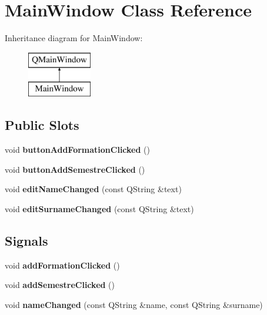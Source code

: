 \hypertarget{classMainWindow}{\section{Main\+Window Class Reference}
\label{classMainWindow}
}
Inheritance diagram for Main\+Window\+:\begin{figure}[H]
\begin{center}
\leavevmode
\includegraphics[height=2.000000cm]{classMainWindow}
\end{center}
\end{figure}
\subsection*{Public Slots}
\begin{DoxyCompactItemize}
\item 
\hypertarget{classMainWindow_ae57c5976e1e8afb836fc0668aaaa000c}{void {\bfseries button\+Add\+Formation\+Clicked} ()}\label{classMainWindow_ae57c5976e1e8afb836fc0668aaaa000c}

\item 
\hypertarget{classMainWindow_ac92e784d08c3797023da714057db1cfc}{void {\bfseries button\+Add\+Semestre\+Clicked} ()}\label{classMainWindow_ac92e784d08c3797023da714057db1cfc}

\item 
\hypertarget{classMainWindow_a5966da1b123ebab9fa12804a650148db}{void {\bfseries edit\+Name\+Changed} (const Q\+String \&text)}\label{classMainWindow_a5966da1b123ebab9fa12804a650148db}

\item 
\hypertarget{classMainWindow_a0d4a0102449a45525b9877b93ff5abb4}{void {\bfseries edit\+Surname\+Changed} (const Q\+String \&text)}\label{classMainWindow_a0d4a0102449a45525b9877b93ff5abb4}

\end{DoxyCompactItemize}
\subsection*{Signals}
\begin{DoxyCompactItemize}
\item 
\hypertarget{classMainWindow_a10491cf43441856bb6909de69b5bedcb}{void {\bfseries add\+Formation\+Clicked} ()}\label{classMainWindow_a10491cf43441856bb6909de69b5bedcb}

\item 
\hypertarget{classMainWindow_a6eab6e752afad90ad02c97522cbc0db9}{void {\bfseries add\+Semestre\+Clicked} ()}\label{classMainWindow_a6eab6e752afad90ad02c97522cbc0db9}

\item 
\hypertarget{classMainWindow_aef78295e40864463c856aeb47f00ff83}{void {\bfseries name\+Changed} (const Q\+String \&name, const Q\+String \&surname)}\label{classMainWindow_aef78295e40864463c856aeb47f00ff83}

\end{DoxyCompactItemize}
